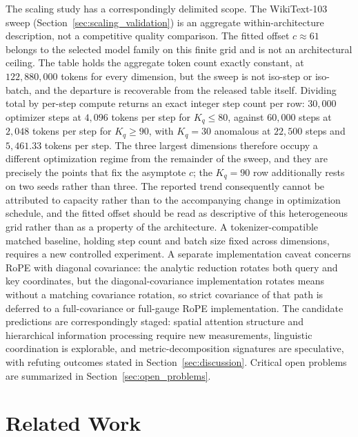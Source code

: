 \documentclass[11pt]{article}
\begin{document}
The scaling study has a correspondingly delimited scope. The WikiText-103 sweep (Section~\ref{sec:scaling_validation}) is an aggregate within-architecture description, not a competitive quality comparison. The fitted offset $c\approx61$ belongs to the selected model family on this finite grid and is not an architectural ceiling. The table holds the aggregate token count exactly constant, at $122{,}880{,}000$ tokens for every dimension, but the sweep is not iso-step or iso-batch, and the departure is recoverable from the released table itself. Dividing total by per-step compute returns an exact integer step count per row: $30{,}000$ optimizer steps at $4{,}096$ tokens per step for $K_q \le 80$, against $60{,}000$ steps at $2{,}048$ tokens per step for $K_q \ge 90$, with $K_q = 30$ anomalous at $22{,}500$ steps and $5{,}461.33$ tokens per step. The three largest dimensions therefore occupy a different optimization regime from the remainder of the sweep, and they are precisely the points that fix the asymptote $c$; the $K_q = 90$ row additionally rests on two seeds rather than three. The reported trend consequently cannot be attributed to capacity rather than to the accompanying change in optimization schedule, and the fitted offset should be read as descriptive of this heterogeneous grid rather than as a property of the architecture. A tokenizer-compatible matched baseline, holding step count and batch size fixed across dimensions, requires a new controlled experiment. A separate implementation caveat concerns RoPE with diagonal covariance: the analytic reduction rotates both query and key coordinates, but the diagonal-covariance implementation rotates means without a matching covariance rotation, so strict covariance of that path is deferred to a full-covariance or full-gauge RoPE implementation. The candidate predictions are correspondingly staged: spatial attention structure and hierarchical information processing require new measurements, linguistic coordination is explorable, and metric-decomposition signatures are speculative, with refuting outcomes stated in Section~\ref{sec:discussion}. Critical open problems are summarized in Section~\ref{sec:open_problems}.

\section{Related Work}\label{sec:related_work}
\end{document}
